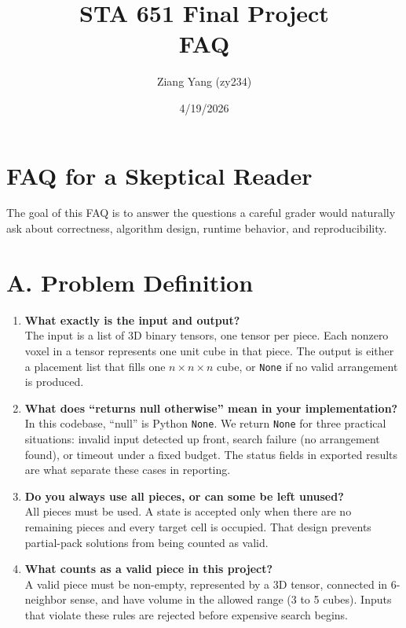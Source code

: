 \documentclass[11pt]{article}
\title{\vspace{-28pt}\Large STA 651 Final Project\\[4pt]
\textbf{FAQ}}
\author{ Ziang Yang (zy234)}
\date{4/19/2026}
\begin{document}
\maketitle
\thispagestyle{fancy}
\vspace{-20pt}

\section*{FAQ for a Skeptical Reader}
\noindent The goal of this FAQ is to answer the questions a careful grader would naturally ask about correctness, algorithm design, runtime behavior, and reproducibility.

\section*{A. Problem Definition}
\begin{enumerate}[leftmargin=*,label=\textbf{Q\arabic*.},start=1]
\item \textbf{What exactly is the input and output?}\\
The input is a list of 3D binary tensors, one tensor per piece. Each nonzero voxel in a tensor represents one unit cube in that piece. The output is either a placement list that fills one $n \times n \times n$ cube, or \texttt{None} if no valid arrangement is produced.

\item \textbf{What does ``returns null otherwise'' mean in your implementation?}\\
In this codebase, ``null'' is Python \texttt{None}. We return \texttt{None} for three practical situations: invalid input detected up front, search failure (no arrangement found), or timeout under a fixed budget. The status fields in exported results are what separate these cases in reporting.

\item \textbf{Do you always use all pieces, or can some be left unused?}\\
All pieces must be used. A state is accepted only when there are no remaining pieces and every target cell is occupied. That design prevents partial-pack solutions from being counted as valid.

\item \textbf{What counts as a valid piece in this project?}\\
A valid piece must be non-empty, represented by a 3D tensor, connected in 6-neighbor sense, and have volume in the allowed range (3 to 5 cubes). Inputs that violate these rules are rejected before expensive search begins.
\end{enumerate}
\end{document}
